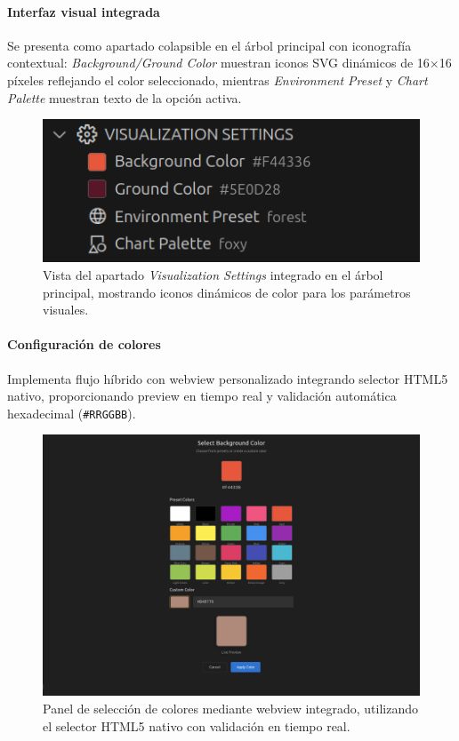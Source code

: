 \documentclass[a4paper, 12pt]{book}
\begin{document}
\paragraph{Interfaz visual integrada}
Se presenta como apartado colapsible en el árbol principal con iconografía contextual: \emph{Background/Ground Color} muestran iconos SVG dinámicos de 16×16 píxeles reflejando el color seleccionado, mientras \emph{Environment Preset} y \emph{Chart Palette} muestran texto de la opción activa.

\begin{figure}[H]
\centering
\includegraphics[width=0.60\linewidth]{img/ui-visualization-settings-tree.png}
\caption{Vista del apartado \emph{Visualization Settings} integrado en el árbol principal, mostrando iconos dinámicos de color para los parámetros visuales.}
\label{fig:ui-visualization-settings-tree}
\end{figure}

\paragraph{Configuración de colores}
Implementa flujo híbrido con webview personalizado integrando selector HTML5 nativo, proporcionando preview en tiempo real y validación automática hexadecimal (\texttt{\#RRGGBB}).

\begin{figure}[H]
\centering
\includegraphics[width=0.60\linewidth]{img/ui-color-picker-panel.png}
\caption{Panel de selección de colores mediante webview integrado, utilizando el selector HTML5 nativo con validación en tiempo real.}
\label{fig:ui-color-picker-panel}
\end{figure}
\end{document}
